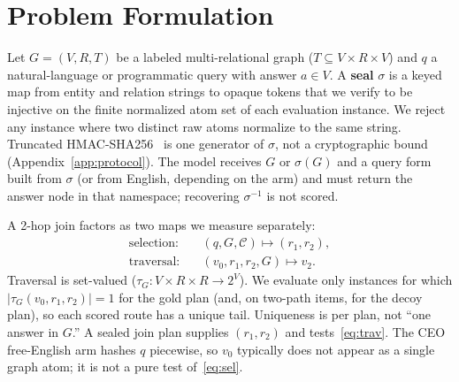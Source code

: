 \documentclass[10pt]{article} %
\begin{document}
\section{Problem Formulation}
\label{sec:problem}

Let $G=(V,R,T)$ be a labeled multi-relational graph
($T\subseteq V\times R\times V$) and $q$ a natural-language or programmatic
query with answer $a\in V$. A \textbf{seal} $\sigma$ is a keyed map from
entity and relation strings to opaque tokens that we verify to be injective
on the finite normalized atom set of each evaluation instance. We reject any
instance where two distinct raw atoms normalize to the same string.
Truncated HMAC-SHA256~\citep{krawczyk1997hmac} is one generator of $\sigma$, not a cryptographic
bound (Appendix~\ref{app:protocol}). The model receives $G$ or $\sigma(G)$
and a query form built from $\sigma$ (or from English, depending on the arm)
and must return the answer node in that namespace; recovering $\sigma^{-1}$
is not scored.

A 2-hop join factors as two maps we measure separately:
\begin{align}
\text{selection:}&\quad (q,G,\mathcal{C})\mapsto (r_1,r_2), \label{eq:sel}\\
\text{traversal:}&\quad (v_0,r_1,r_2,G)\mapsto v_2. \label{eq:trav}
\end{align}
Traversal is set-valued ($\tau_G\colon V\times R\times R\to 2^V$).
We evaluate only instances for which $|\tau_G(v_0,r_1,r_2)|=1$ for the gold
plan (and, on two-path items, for the decoy plan), so each scored route has
a unique tail. Uniqueness is per plan, not ``one answer in $G$.''
A sealed join plan supplies $(r_1,r_2)$ and tests~\eqref{eq:trav}.
The CEO free-English arm hashes $q$ piecewise, so $v_0$ typically does not
appear as a single graph atom; it is not a pure test of~\eqref{eq:sel}.
\end{document}
